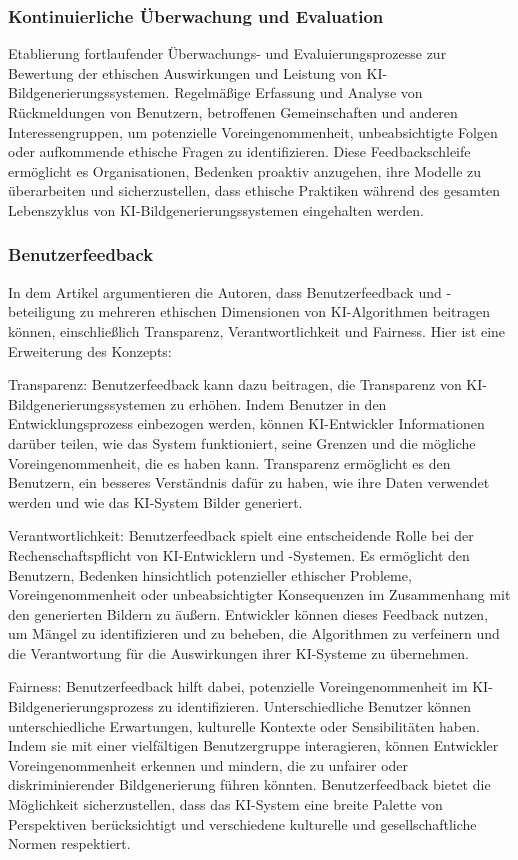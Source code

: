 \documentclass[12pt]{report}
\begin{document}
\subsubsection{Kontinuierliche Überwachung und Evaluation}
Etablierung fortlaufender Überwachungs- und Evaluierungsprozesse zur Bewertung der ethischen Auswirkungen und Leistung von KI-Bildgenerierungssystemen. Regelmäßige Erfassung und Analyse von Rückmeldungen von Benutzern, betroffenen Gemeinschaften und anderen Interessengruppen, um potenzielle Voreingenommenheit, unbeabsichtigte Folgen oder aufkommende ethische Fragen zu identifizieren. Diese Feedbackschleife ermöglicht es Organisationen, Bedenken proaktiv anzugehen, ihre Modelle zu überarbeiten und sicherzustellen, dass ethische Praktiken während des gesamten Lebenszyklus von KI-Bildgenerierungssystemen eingehalten werden.
\cite{EUCommision}
\subsubsection{Benutzerfeedback}
In dem Artikel \cite{Mittelstadt} argumentieren die Autoren, dass Benutzerfeedback und -beteiligung zu mehreren ethischen Dimensionen von KI-Algorithmen beitragen können, einschließlich Transparenz, Verantwortlichkeit und Fairness. Hier ist eine Erweiterung des Konzepts:

Transparenz: Benutzerfeedback kann dazu beitragen, die Transparenz von KI-Bildgenerierungssystemen zu erhöhen. Indem Benutzer in den Entwicklungsprozess einbezogen werden, können KI-Entwickler Informationen darüber teilen, wie das System funktioniert, seine Grenzen und die mögliche Voreingenommenheit, die es haben kann. Transparenz ermöglicht es den Benutzern, ein besseres Verständnis dafür zu haben, wie ihre Daten verwendet werden und wie das KI-System Bilder generiert.

Verantwortlichkeit: Benutzerfeedback spielt eine entscheidende Rolle bei der Rechenschaftspflicht von KI-Entwicklern und -Systemen. Es ermöglicht den Benutzern, Bedenken hinsichtlich potenzieller ethischer Probleme, Voreingenommenheit oder unbeabsichtigter Konsequenzen im Zusammenhang mit den generierten Bildern zu äußern. Entwickler können dieses Feedback nutzen, um Mängel zu identifizieren und zu beheben, die Algorithmen zu verfeinern und die Verantwortung für die Auswirkungen ihrer KI-Systeme zu übernehmen.

Fairness: Benutzerfeedback hilft dabei, potenzielle Voreingenommenheit im KI-Bildgenerierungsprozess zu identifizieren. Unterschiedliche Benutzer können unterschiedliche Erwartungen, kulturelle Kontexte oder Sensibilitäten haben. Indem sie mit einer vielfältigen Benutzergruppe interagieren, können Entwickler Voreingenommenheit erkennen und mindern, die zu unfairer oder diskriminierender Bildgenerierung führen könnten. Benutzerfeedback bietet die Möglichkeit sicherzustellen, dass das KI-System eine breite Palette von Perspektiven berücksichtigt und verschiedene kulturelle und gesellschaftliche Normen respektiert.
\end{document}
